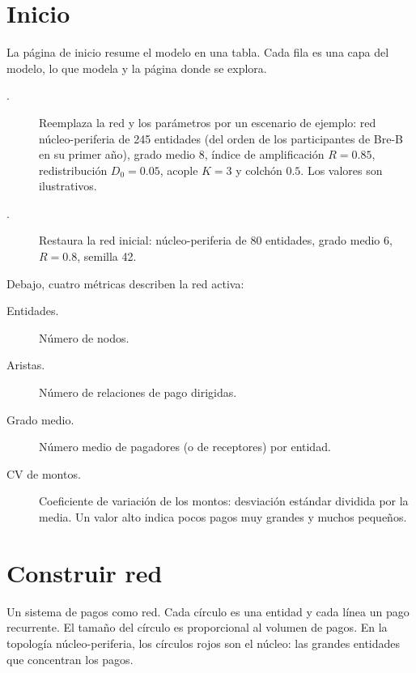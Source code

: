 \section{Inicio}


La página de inicio resume el modelo en una tabla. Cada fila es una capa del modelo,
lo que modela y la página donde se explora.

\begin{description}
\item[.] Reemplaza la red y los
parámetros por un escenario de ejemplo: red núcleo-periferia de 245 entidades (del orden
de los participantes de Bre-B en su primer año), grado medio 8, índice de amplificación
$R=0.85$, redistribución $D_0=0.05$, acople $K=3$ y colchón $0.5$. Los valores son
ilustrativos.
\item[.] Restaura la red inicial: núcleo-periferia de
80 entidades, grado medio 6, $R=0.8$, semilla 42.
\end{description}

Debajo, cuatro métricas describen la red activa:

\begin{description}
\item[Entidades.] Número de nodos.
\item[Aristas.] Número de relaciones de pago dirigidas.
\item[Grado medio.] Número medio de pagadores (o de receptores) por entidad.
\item[CV de montos.] Coeficiente de variación de los montos: desviación estándar
dividida por la media. Un valor alto indica pocos pagos muy grandes y muchos pequeños.
\end{description}

\section{Construir red}


\begin{representa}
Un sistema de pagos como red. Cada círculo es una entidad y cada línea un pago
recurrente. El tamaño del círculo es proporcional al volumen de pagos. En la topología
núcleo-periferia, los círculos rojos son el núcleo: las grandes entidades que concentran
los pagos.
\end{representa}


